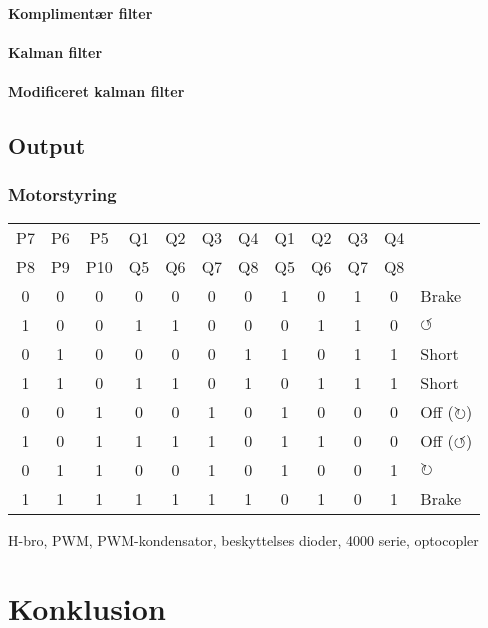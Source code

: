 \documentclass[a4paper,oneside,article,danish,table,draft]{memoir}
\begin{document}
\subsubsection{Komplimentær filter}
\subsubsection{Kalman filter}
\subsubsection{Modificeret kalman filter}

\section{Output}

\subsection{Motorstyring}
\begin{table}[htbp]
  \centering
  \begin{tabular}{ccc|cccc|ccccl}
      \toprule
     P7&P6&P5 &Q1&Q2&Q3&Q4 &Q1&Q2&Q3&Q4\\
     P8&P9&P10 &Q5&Q6&Q7&Q8 &Q5&Q6&Q7&Q8\\
      \midrule
     0&0&0 &0&0&0&0 &1&0&1&0 & Brake\\
     1&0&0 &1&1&0&0 &0&1&1&0 & $\circlearrowleft$\\
     0&1&0 &0&0&0&1 &1&0&1&1 & Short\\
     1&1&0 &1&1&0&1 &0&1&1&1 & Short\\
     0&0&1 &0&0&1&0 &1&0&0&0 & Off ($\circlearrowright$)\\
     1&0&1 &1&1&1&0 &1&1&0&0 & Off ($\circlearrowleft$)\\
     0&1&1 &0&0&1&0 &1&0&0&1 & $\circlearrowright$\\
     1&1&1 &1&1&1&1 &0&1&0&1 & Brake\\
    \end{tabular}
  \end{table}

H-bro, PWM, PWM-kondensator, beskyttelses dioder, 4000 serie, optocopler



\chapter{Konklusion} \label{chap:kon}
\clearpage
\listoftables
\listoffigures
 
\clearpage \appendix
\end{document}
